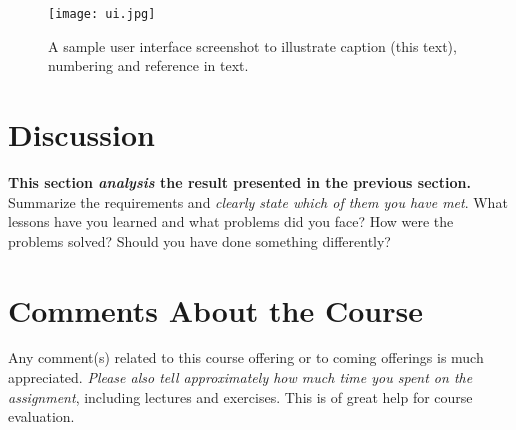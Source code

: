 \documentclass[a4paper]{scrartcl}
\begin{document}
\begin{figure}[h!]
  \begin{center}
    \texttt{[image: ui.jpg]}
    \caption{A sample user interface screenshot to illustrate caption (this text), numbering and reference in text.}
    \label{fig:ui}
  \end{center}
\end{figure}

\section{Discussion}

\textbf{This section \textit{analysis} the result presented in the previous section.} \\

\noindent Summarize the requirements and \textit{clearly state which of them you have met}. What lessons have you learned and what problems did you face? How were the problems solved? Should you have done something differently?

\section{Comments About the Course}

Any comment(s) related to this course offering or to coming offerings is much appreciated. \textit{Please also tell approximately how much time you spent on the assignment}, including lectures and exercises. This is of great help for course evaluation.
\end{document}
